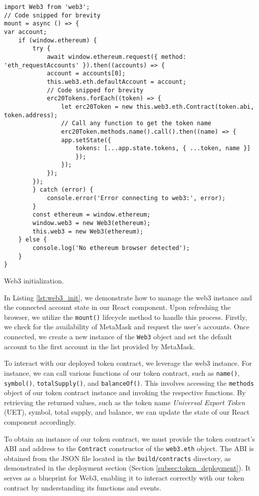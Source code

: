 \begin{listing}[H]
    \begin{verbatim}
import Web3 from 'web3';
// Code snipped for brevity
mount = async () => {
var account;
    if (window.ethereum) {
        try {
            await window.ethereum.request({ method: 'eth_requestAccounts' }).then((accounts) => {
            account = accounts[0];
            this.web3.eth.defaultAccount = account;
            // Code snipped for brevity
            erc20Tokens.forEach((token) => {
                let erc20Token = new this.web3.eth.Contract(token.abi, token.address);
                // Call any function to get the token name
                erc20Token.methods.name().call().then((name) => {
                app.setState({
                    tokens: [...app.state.tokens, { ...token, name }]
                    });
                });
            });
        });
        } catch (error) {
            console.error('Error connecting to web3:', error);
        }
        const ethereum = window.ethereum;
        window.web3 = new Web3(ethereum);
        this.web3 = new Web3(ethereum);
    } else {
        console.log('No ethereum browser detected');
    }
}
    \end{verbatim}
    \caption{Web3 initialization.}
    \label{lst:web3_init}
\end{listing}

In Listing \ref{lst:web3_init}, we demonstrate how to manage the web3 instance and the connected account state in our React component. Upon
refreshing the browser, we utilize the \texttt{mount()} lifecycle method to handle this process. Firstly, we check for the availability
of MetaMask and request the user's accounts. Once connected, we create a new instance of the \texttt{Web3} object and set the default account to the first account in the list provided by MetaMask.


To interact with our deployed token contract, we leverage the web3 instance. For instance, we can call various functions of our token contract, such as
\texttt{name()}, \texttt{symbol()}, \texttt{totalSupply()}, and \texttt{balanceOf()}. This involves accessing the \texttt{methods} object of our
token contract instance and invoking the respective functions. By retrieving the returned values, such as the token name \textit{Universal Export Token} (UET), symbol,
total supply, and balance, we can update the state of our React component accordingly.


To obtain an instance of our token contract, we must provide the token contract's ABI and address to the \texttt{Contract} constructor of the
\texttt{web3.eth} object. The ABI is obtained from the JSON file located in the \texttt{build/contracts} directory, as demonstrated in the
deployment section (Section \ref{subsec:token_deployment}). It serves as a blueprint for Web3, enabling it to interact correctly with our token
contract by understanding its functions and events.




